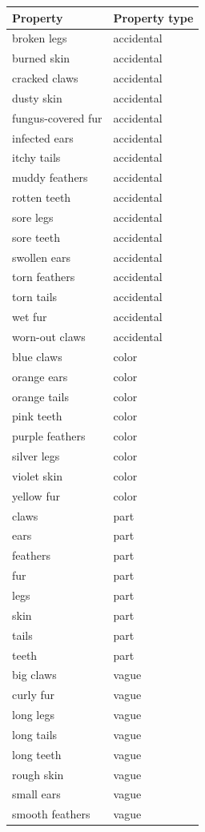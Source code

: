 \documentclass[floatsintext,doc]{apa6}
\begin{document}
\endgroup


\begingroup\fontsize{11pt}{12pt}\selectfont

\begin{longtable}{ |p{3in}| |p{2 in}|}
  \hline
{\bfseries Property} & {\bfseries Property type} \\ 
  \hline
broken legs & accidental \\ 
   \hline
burned skin & accidental \\ 
   \hline
cracked claws & accidental \\ 
   \hline
dusty skin & accidental \\ 
   \hline
fungus-covered fur & accidental \\ 
   \hline
infected ears & accidental \\ 
   \hline
itchy tails & accidental \\ 
   \hline
muddy feathers & accidental \\ 
   \hline
rotten teeth & accidental \\ 
   \hline
sore legs & accidental \\ 
   \hline
sore teeth & accidental \\ 
   \hline
swollen ears & accidental \\ 
   \hline
torn feathers & accidental \\ 
   \hline
torn tails & accidental \\ 
   \hline
wet fur & accidental \\ 
   \hline
worn-out claws & accidental \\ 
   \hline
blue claws & color \\ 
   \hline
orange ears & color \\ 
   \hline
orange tails & color \\ 
   \hline
pink teeth & color \\ 
   \hline
purple feathers & color \\ 
   \hline
silver legs & color \\ 
   \hline
violet skin & color \\ 
   \hline
yellow fur & color \\ 
   \hline
claws & part \\ 
   \hline
ears & part \\ 
   \hline
feathers & part \\ 
   \hline
fur & part \\ 
   \hline
legs & part \\ 
   \hline
skin & part \\ 
   \hline
tails & part \\ 
   \hline
teeth & part \\ 
   \hline
big claws & vague \\ 
   \hline
curly fur & vague \\ 
   \hline
long legs & vague \\ 
   \hline
long tails & vague \\ 
   \hline
long teeth & vague \\ 
   \hline
rough skin & vague \\ 
   \hline
small ears & vague \\ 
   \hline
smooth feathers & vague \\ 
   \hline


\end{longtable}
\end{document}
